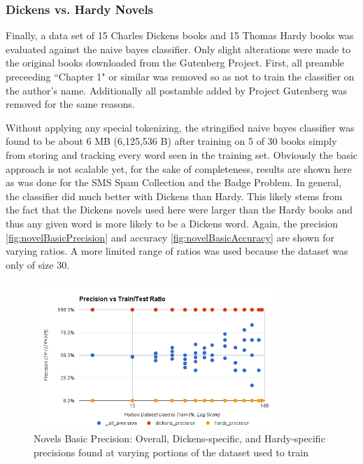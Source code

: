 \subsubsection{Dickens vs. Hardy Novels}
\label{subsection:novelsBasic}
Finally, a data set of 15 Charles Dickens books \cite{gutenberg:dickens} and 15 Thomas Hardy books \cite{gutenberg:hardy}
was evaluated against the naive bayes classifier. Only slight alterations were made to the original books downloaded
from the Gutenberg Project. First, all preamble preceeding ``Chapter 1" or similar was removed so as not to train the
classifier on the author's name. Additionally all postamble added by Project Gutenberg was removed for the same reasons.

Without applying any special tokenizing, the stringified naive bayes classifier was found to be about 6 MB (6,125,536 B)
after training on 5 of 30 books simply from storing and tracking every word seen in the training set. Obviously the
basic approach is not scalable yet, for the sake of completeness, results are shown here as was done for the SMS Spam
Collection and the Badge Problem. In general, the classifier did much better with Dickens than Hardy. This likely
stems from the fact that the Dickens novels used here were larger than the Hardy books and thus any given word is more
likely to be a Dickens word. Again, the precision \ref{fig:novelBasicPrecision} and accuracy \ref{fig:novelBasicAccuracy}
are shown for varying ratios. A more limited range of ratios was used because the dataset was only of size 30.

\begin{figure}[ht!]
    \centering
    \includegraphics[width=90mm]{img/novels_basic-precision.png}
    \caption{Novels Basic Precision: Overall, Dickens-specific, and Hardy-specific precisions found at varying portions of the dataset used to train}
    \label{fig:spamBasicPrecision}
\end{figure}

